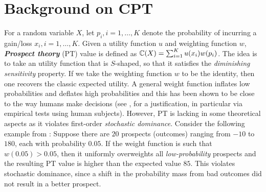 

\appendix


\section{Background on CPT}
\label{sec:appendix-cpt-intro}
For a random variable $X$, let $p_i, i=1,\ldots,K$ denote the probability of incurring a gain/loss $x_i, i=1,\ldots,K$. %
Given a utility function $u$ and weighting function $w$, \textit{\textbf{Prospect theory}} (PT) value is defined as $\mathbb{C}(X) = \sum_{i=1}^K u(x_i) w(p_i)$. 
The idea is to take an utility function that is $S$-shaped, so that it satisfies the \textit{diminishing sensitivity}  property. 
If we take the weighting function $w$ to be the identity, then one recovers the classic expected utility. A general weight function inflates low probabilities and deflates high probabilities and this has been shown to be close to the way humans make decisions (see \cite{kahneman1979prospect}, \cite{fennema1997original} for a justification, in particular via empirical tests using human subjects).
However, PT is lacking in some theoretical aspects as it violates first-order \textit{stochastic dominance}. Consider the following example from \cite{fennema1997original}: Suppose there are $20$ prospects (outcomes) ranging from $-10$ to $180$, each with probability $0.05$. If the weight function is such that $w(0.05) > 0.05$, then it uniformly overweights all \textit{low-probability} prospects and the resulting PT value is higher than the expected value $85$. This violates stochastic dominance, since a shift in the probability mass from bad outcomes did not result in a better prospect. 

